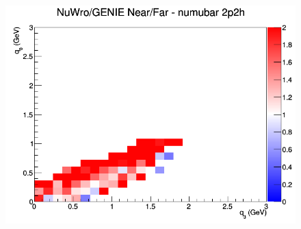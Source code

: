 \begin{figure}[h]
\endminipage
{}
\includegraphics[width=\linewidth]{eff_q0_q3/FGT/ratios/2p2h_NuWro_GENIE_numubar_NF_q3_q0.png}
\endminipage
\newline
\end{figure}
\clearpage
